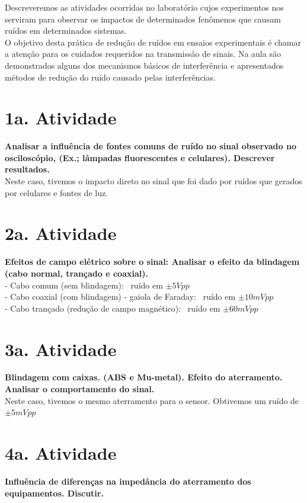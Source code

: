 \documentclass[a4paper, 12pt]{article}
\begin{document}
Descreveremos as atividades ocorridas no laboratório cujos experimentos nos serviram para observar os impactos de determinados fenômenos que causam ruídos em determinados sistemas.\\

O objetivo desta prática de redução de ruídos em ensaios experimentais é chamar a atenção para os cuidados requeridos na transmissão de sinais. Na aula são demonstrados alguns dos mecanismos básicos de interferência e apresentados métodos de redução do ruído causado pelas interferências.


\section*{1a. Atividade}
\textbf{Analisar a influência de fontes comuns de ruído no sinal observado no osciloscópio, (Ex.; lâmpadas fluorescentes e celulares). Descrever resultados.}\\

Neste caso, tivemos o impacto direto no sinal que foi dado por ruídos que gerados por celulares e fontes de luz.


\section*{2a. Atividade}
\textbf{Efeitos de campo elétrico sobre o sinal: Analisar o efeito da blindagem (cabo normal, trançado e coaxial).}\\

- Cabo comum (sem blindagem): \>\ ruído em $\pm 5Vpp$\\
- Cabo coaxial (com blindagem) - gaiola de Faraday: \>\ ruído em $\pm 10mV pp$ \\
- Cabo trançado (redução de campo magnético): \>\ ruído em $\pm 60mV pp$\\


\section*{3a. Atividade}
\textbf{Blindagem com caixas. (ABS e Mu-metal). Efeito do aterramento. Analisar o comportamento do sinal.}\\

Neste caso, tivemos o mesmo aterramento para o sensor. Obtivemos um ruído de $\pm 5mVpp$  


\section*{4a. Atividade}
\textbf{Influência de diferenças na impedância do aterramento dos equipamentos. Discutir.}\\
\end{document}
